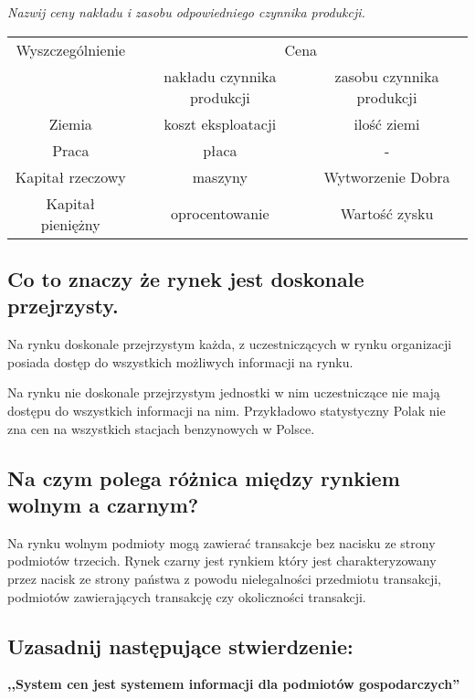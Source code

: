 \documentclass[a4paper,12pt]{article}
\begin{document}
\emph{Nazwij ceny nakładu i zasobu odpowiedniego czynnika produkcji.}

\begin{table}[h]
	\begin{tabular}{|c|c|c|}
		\hline
		Wyszczególnienie & \multicolumn{2}{c|}{Cena} \\ 
		& nakładu czynnika produkcji & zasobu czynnika produkcji \\\hline
		Ziemia	& koszt eksploatacji	 & ilość ziemi 	\\
		Praca	& płaca	 & - \\
		Kapitał rzeczowy	& maszyny	& Wytworzenie Dobra\\
		Kapitał pieniężny	& oprocentowanie & Wartość zysku	\\\hline
	\end{tabular}
	\centering
\end{table}

\subsection{Co to znaczy że rynek jest doskonale przejrzysty.}

Na rynku doskonale przejrzystym każda, z uczestniczących w rynku organizacji posiada dostęp do wszystkich możliwych informacji na rynku.

Na rynku nie doskonale przejrzystym jednostki w nim uczestniczące nie mają dostępu do wszystkich informacji na nim. Przykładowo statystyczny Polak nie zna cen na wszystkich stacjach benzynowych w Polsce.

\subsection{Na czym polega różnica między rynkiem wolnym a czarnym?}

Na rynku wolnym podmioty mogą zawierać transakcje bez nacisku ze strony podmiotów trzecich. Rynek czarny jest rynkiem który jest charakteryzowany przez nacisk ze strony państwa z powodu nielegalności przedmiotu transakcji, podmiotów zawierających transakcję czy okoliczności transakcji.

\subsection{Uzasadnij następujące stwierdzenie:}

\textbf{,,System cen jest systemem informacji dla podmiotów gospodarczych''}
\end{document}
